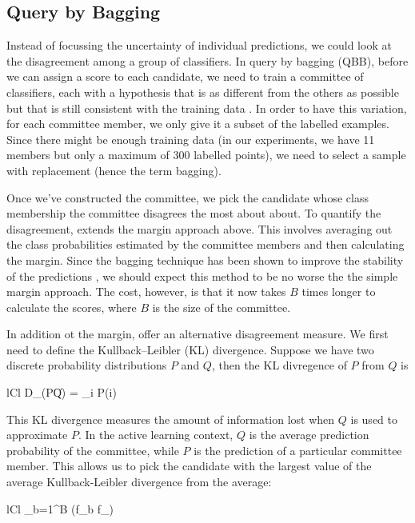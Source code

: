 \subsection{Query by Bagging}

Instead of focussing the uncertainty of individual predictions, we could look at
the disagreement among a group of classifiers. In query by bagging (QBB), before we
can assign a score to each candidate, we need to train a committee of classifiers, each
with a hypothesis that is as different from the others as possible but that is still consistent
with the training data \cite{melville04}. In order to have this variation,
for each committee member, we only give it a subset of the labelled examples. Since there
might be enough training data (in our experiments, we have 11 members but only a maximum 
of 300 labelled points), we need to select a sample with replacement (hence the term bagging).

Once we've constructed the committee, we pick the candidate whose class membership the committee 
disagrees the most about about. To quantify the disagreement,  extends the
margin approach above. This involves averaging out the class probabilities estimated
by the committee members and then calculating the margin. Since the bagging technique
has been shown to improve the stability of the predictions \cite{breiman96}, we should
expect this method to be no worse the the simple margin approach. The cost, however, is that
it now takes $B$ times longer to calculate the scores, where $B$ is the size of the 
committee.

In addition ot the margin,  offer an alternative disagreement measure.
We first need to define the Kullback–Leibler (KL) divergence. Suppose we have two discrete
probability distributions $P$ and $Q$, then the KL divregence of $P$ from $Q$ is
	\begin{IEEEeqnarray*}{lCl}
		D_{}(P\|Q) = \sum_i P(i) \, \ln{}
	\end{IEEEeqnarray*}
This KL divergence measures the amount of information lost when $Q$ is used to approximate $P$. In the active learning context, $Q$ is the average prediction probability of the committee, while $P$ is the prediction of a particular committee member.
This allows us to pick the candidate with the largest value of the average Kullback-Leibler divergence from the average:
	\begin{IEEEeqnarray*}{lCl}
		 \sum_{b=1}^B (f_b \mid\mid f_)
	\end{IEEEeqnarray*}




